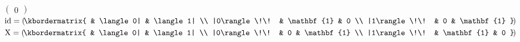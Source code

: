 \documentclass{standalone}
\begin{document}
\begin{math}\displaystyle
\begin{pmatrix}
  0
\end{pmatrix}
\end{math}
\begin{math}\displaystyle
  \mathrm{id} =
    \left(\!\kbordermatrix{
                     & \langle 0| & \langle 1| \\
       |0\rangle\!\! & \mathbf{1} &          0 \\
       |1\rangle\!\! &          0 & \mathbf{1}
    }\!\right)
\end{math}
\begin{math}\displaystyle
  \mathrm{X} =
    \left(\!\kbordermatrix{
                     & \langle 0| & \langle 1| \\
       |0\rangle\!\! &          0 & \mathbf{1} \\
       |1\rangle\!\! & \mathbf{1} &          0
    }\!\right)
\end{math}
\end{document}
